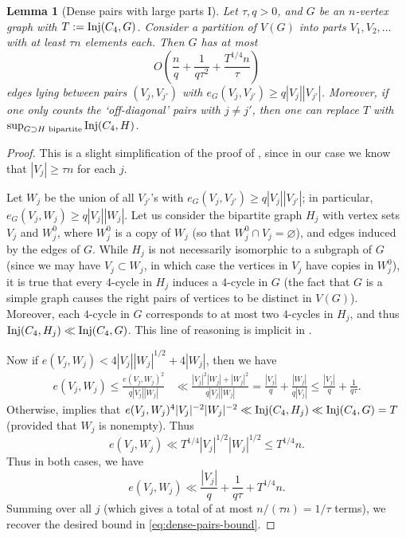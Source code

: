\documentclass[reqno,11pt]{amsart}
\newtheorem{lemma}[theorem]{Lemma}
\theoremstyle{definition}
\theoremstyle{remark}
\numberwithin{equation}{section}
\renewcommand{\emptyset}{\varnothing}
\newcommand{\Inj}{\textnormal{Inj}}
\begin{document}
\begin{lemma}[Dense pairs with large parts I] \label{lem:dense-pairs-1}
Let $\tau, q > 0$, and $G$ be an $n$-vertex graph with $T := \Inj(C_4, G)$. Consider a partition of $V(G)$ into parts $V_1, V_2, \ldots$ with at least $\tau n$ elements each. Then $G$ has at most
\begin{equation} \label{eq:dense-pairs-bound}
    O\left(\frac{n}{q} + \frac{1}{q\tau^2} + \frac{T^{1/4}n}{\tau}\right)
\end{equation}
edges lying between pairs $(V_j, V_{j'})$ with $e_G(V_j, V_{j'}) \ge q|V_j||V_{j'}|$. Moreover, if one only counts the `off-diagonal' pairs with $j \neq j'$, then one can replace $T$ with $\sup_{G \supset H \textnormal{ bipartite}} \Inj(C_4, H)$.
\end{lemma}

\begin{proof}
This is a slight simplification of the proof of \cite[Lemma 2.4]{conlon2021regularity}, since in our case we know that $|V_j| \ge \tau n$ for each $j$. 

Let $W_j$ be the union of all $V_{j'}$'s with $e_G(V_j, V_{j'}) \ge q|V_j||V_{j'}|$; in particular, $e_G(V_j, W_j) \ge q|V_j||W_j|$. Let us consider the bipartite graph $H_j$ with vertex sets $V_j$ and $W_j^0$, where $W_j^0$ is a copy of $W_j$ (so that $W_j^0 \cap V_j = \emptyset$), and edges induced by the edges of $G$. While $H_j$ is not necessarily isomorphic to a subgraph of $G$ (since we may have $V_j \subset W_j$, in which case the vertices in $V_j$ have copies in $W_j^0$), it is true that every $4$-cycle in $H_j$ induces a $4$-cycle in $G$ (the fact that $G$ is a simple graph causes the right pairs of vertices to be distinct in $V(G)$). Moreover, each $4$-cycle in $G$ corresponds to at most two $4$-cycles in $H_j$, and thus $\Inj(C_4, H_j) \ll \Inj(C_4, G)$. This line of reasoning is implicit in \cite[Lemma 2.4]{conlon2021regularity}.

Now if $e(V_j, W_j) < 4|V_j||W_j|^{1/2} + 4|W_j|$, then we have
\[
\begin{aligned}
    e(V_j, W_j) \le \frac{e(V_j, W_j)^2}{q|V_j||W_j|}
    &\ll 
    \frac{|V_j|^2|W_j| + |W_j|^2}{q|V_j||W_j|}
    =
    \frac{|V_j|}{q} + \frac{|W_j|}{q|V_j|}
    \le 
    \frac{|V_j|}{q} + \frac{1}{q\tau}.
\end{aligned}
\]
Otherwise, \cite[Lemma 2.3]{conlon2021regularity} implies that $e(V_j, W_j)^4 |V_j|^{-2} |W_j|^{-2} \ll \Inj(C_4, H_j) \ll \Inj(C_4, G) = T$ (provided that $W_j$ is nonempty). Thus
\[
    e(V_j, W_j) \ll T^{1/4} |V_j|^{1/2} |W_j|^{1/2} \le T^{1/4} n.
\]
Thus in both cases, we have
\[
    e(V_j, W_j) \ll \frac{|V_j|}{q} + \frac{1}{q\tau} + T^{1/4} n.
\]
Summing over all $j$ (which gives a total of at most $n/(\tau n) = 1/\tau$ terms), we recover the desired bound in \cref{eq:dense-pairs-bound}.


\end{proof}
\end{document}
